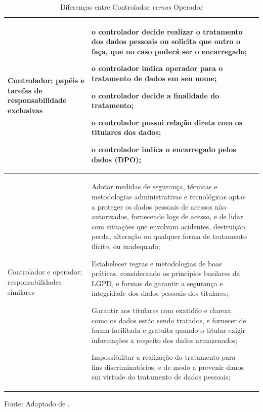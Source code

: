\documentclass[
	12pt,				%
	openright,			%
	oneside,			%
	a4paper,			%
	english,			%
	french,				%
	spanish,			%
	brazil,				%
	]{abntex2}
\begin{document}
\begin{table}[ht]
    \centering
    \caption{Diferenças entre Controlador \textit{versus} Operador}
    \label{tab: Diferenças entre controlador e operador}

    \begin{tabular}{|p{4 cm}|p{11.5cm}|p{0cm}|} 
        \hline

Controlador: papéis e tarefas de responsabilidade exclusivas 
&
\begin{tabitemize}
\item o controlador decide realizar o tratamento dos dados pessoais ou solicita que outro o faça, que no caso poderá ser o encarregado;
\item o controlador indica operador para o tratamento de dados em seu nome;
\item o controlador decide a finalidade do tratamento;
\item o controlador possui relação direta com os titulares dos dados;
\item o controlador indica o encarregado pelos dados (DPO);
\end{tabitemize}\\ \hline

Controlador e operador: responsabilidades similares
&
\begin{tabitemize}
\item Adotar medidas de segurança, técnicas e metodologias administrativas e tecnológicas aptas a proteger os dados pessoais de acessos não autorizados, fornecendo logs de acesso, e de lidar com situações que envolvam acidentes, destruição, perda, alteração ou qualquer forma de tratamento ilícito, ou inadequado;

\item Estabelecer regras e metodologias de boas práticas, considerando os princípios basilares da LGPD, e formas de garantir a segurança e integridade dos dados pessoais dos titulares;

\item Garantir aos titulares com exatidão e clareza como os dados estão sendo tratados, e fornecer de forma facilitada e gratuita quando o titular exigir informações a respeito dos dados armazenados;

\item Impossibilitar a realização do tratamento para fins discriminatórios, e de modo a prevenir danos em virtude do tratamento de dados pessoais;

\end{tabitemize}\\ \hline
 
    \end{tabular}
    \newline \newline Fonte: Adaptado de .
\end{table}
\end{document}
